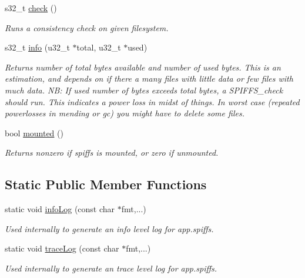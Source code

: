 \begin{DoxyCompactItemize}
s32\+\_\+t \mbox{\hyperlink{class_spiffs_particle_a9ca5ff16a1168aef2d0b1aa1b1b9e1e0}{check}} ()
\begin{DoxyCompactList}\small\item\em Runs a consistency check on given filesystem. \end{DoxyCompactList}\item 
s32\+\_\+t \mbox{\hyperlink{class_spiffs_particle_afb2bb434707069b737e54fb342e9831b}{info}} (u32\+\_\+t $\ast$total, u32\+\_\+t $\ast$used)
\begin{DoxyCompactList}\small\item\em Returns number of total bytes available and number of used bytes. This is an estimation, and depends on if there a many files with little data or few files with much data. NB\+: If used number of bytes exceeds total bytes, a S\+P\+I\+F\+F\+S\+\_\+check should run. This indicates a power loss in midst of things. In worst case (repeated powerlosses in mending or gc) you might have to delete some files. \end{DoxyCompactList}\item 
\mbox{\label{class_spiffs_particle_a7dca116e5b60e5a46a10a15bdd747ca2}} 
bool \mbox{\hyperlink{class_spiffs_particle_a7dca116e5b60e5a46a10a15bdd747ca2}{mounted}} ()
\begin{DoxyCompactList}\small\item\em Returns nonzero if spiffs is mounted, or zero if unmounted. \end{DoxyCompactList}\end{DoxyCompactItemize}
\subsection*{Static Public Member Functions}
\begin{DoxyCompactItemize}
\item 
\mbox{\label{class_spiffs_particle_aae0af1b65302b4ef3cd3b95f9239bc12}} 
static void \mbox{\hyperlink{class_spiffs_particle_aae0af1b65302b4ef3cd3b95f9239bc12}{info\+Log}} (const char $\ast$fmt,...)
\begin{DoxyCompactList}\small\item\em Used internally to generate an info level log for app.\+spiffs. \end{DoxyCompactList}\item 
\mbox{\label{class_spiffs_particle_ab74ae23691bfc91496484cc4cda489d9}} 
static void \mbox{\hyperlink{class_spiffs_particle_ab74ae23691bfc91496484cc4cda489d9}{trace\+Log}} (const char $\ast$fmt,...)
\begin{DoxyCompactList}\small\item\em Used internally to generate an trace level log for app.\+spiffs. \end{DoxyCompactList}\end{DoxyCompactItemize}


